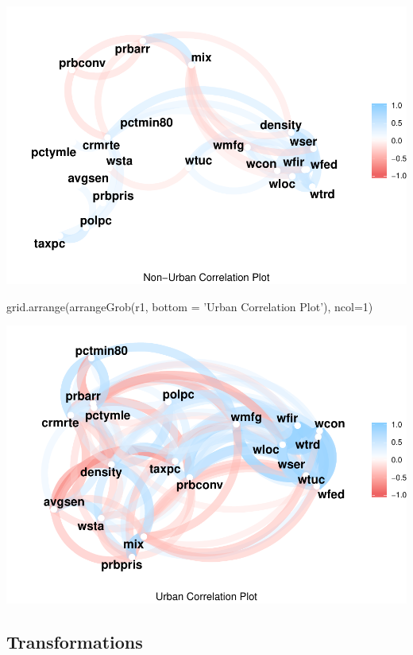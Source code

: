 \documentclass[]{article}
\newenvironment{Shaded}{}{}
\newcommand{\DataTypeTok}[1]{#1}
\newcommand{\DecValTok}[1]{#1}
\newcommand{\KeywordTok}[1]{\textcolor[rgb]{0.00,0.00,1.00}{#1}}
\newcommand{\NormalTok}[1]{#1}
\newcommand{\StringTok}[1]{\textcolor[rgb]{0.00,0.50,0.50}{#1}}
\begin{document}
\includegraphics{Bagnard_Gaustad_Hartman_Leung_Lab_3_files/figure-latex/unnamed-chunk-91-4.pdf}

\begin{Shaded}
\begin{Highlighting}[]
\KeywordTok{grid.arrange}\NormalTok{(}\KeywordTok{arrangeGrob}\NormalTok{(r1, }\DataTypeTok{bottom =} \StringTok{'Urban Correlation Plot'}\NormalTok{), }\DataTypeTok{ncol=}\DecValTok{1}\NormalTok{)}
\end{Highlighting}
\end{Shaded}

\includegraphics{Bagnard_Gaustad_Hartman_Leung_Lab_3_files/figure-latex/unnamed-chunk-91-5.pdf}

\hypertarget{transformations}{%
\subsection{Transformations}\label{transformations}}
\end{document}
